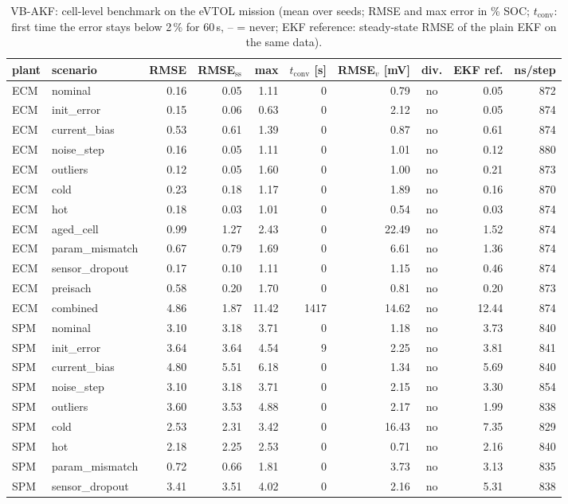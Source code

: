 \begin{table}[H]\centering\footnotesize\setlength{\tabcolsep}{4pt}
\caption{VB-AKF: cell-level benchmark on the eVTOL mission (mean over seeds; RMSE and max error in \% SOC; $t_\mathrm{conv}$: first time the error stays below 2\,\% for 60\,s, -- = never; EKF reference: steady-state RMSE of the plain EKF on the same data).}\label{tab:cell_VBAKF}
\begin{tabular}{llrrrrrcrr}\toprule
plant & scenario & RMSE & RMSE$_\mathrm{ss}$ & max & $t_\mathrm{conv}$ [s] & RMSE$_v$ [mV] & div. & EKF ref. & ns/step \\ \midrule
ECM & nominal & 0.16 & 0.05 & 1.11 & 0 & 0.79 & no & 0.05 & 872 \\
ECM & init\_error & 0.15 & 0.06 & 0.63 & 0 & 2.12 & no & 0.05 & 874 \\
ECM & current\_bias & 0.53 & 0.61 & 1.39 & 0 & 0.87 & no & 0.61 & 874 \\
ECM & noise\_step & 0.16 & 0.05 & 1.11 & 0 & 1.01 & no & 0.12 & 880 \\
ECM & outliers & 0.12 & 0.05 & 1.60 & 0 & 1.00 & no & 0.21 & 873 \\
ECM & cold & 0.23 & 0.18 & 1.17 & 0 & 1.89 & no & 0.16 & 870 \\
ECM & hot & 0.18 & 0.03 & 1.01 & 0 & 0.54 & no & 0.03 & 874 \\
ECM & aged\_cell & 0.99 & 1.27 & 2.43 & 0 & 22.49 & no & 1.52 & 874 \\
ECM & param\_mismatch & 0.67 & 0.79 & 1.69 & 0 & 6.61 & no & 1.36 & 874 \\
ECM & sensor\_dropout & 0.17 & 0.10 & 1.11 & 0 & 1.15 & no & 0.46 & 874 \\
ECM & preisach & 0.58 & 0.20 & 1.70 & 0 & 0.81 & no & 0.20 & 873 \\
ECM & combined & 4.86 & 1.87 & 11.42 & 1417 & 14.62 & no & 12.44 & 874 \\
\midrule
SPM & nominal & 3.10 & 3.18 & 3.71 & 0 & 1.18 & no & 3.73 & 840 \\
SPM & init\_error & 3.64 & 3.64 & 4.54 & 9 & 2.25 & no & 3.81 & 841 \\
SPM & current\_bias & 4.80 & 5.51 & 6.18 & 0 & 1.34 & no & 5.69 & 840 \\
SPM & noise\_step & 3.10 & 3.18 & 3.71 & 0 & 2.15 & no & 3.30 & 854 \\
SPM & outliers & 3.60 & 3.53 & 4.88 & 0 & 2.17 & no & 1.99 & 838 \\
SPM & cold & 2.53 & 2.31 & 3.42 & 0 & 16.43 & no & 7.35 & 829 \\
SPM & hot & 2.18 & 2.25 & 2.53 & 0 & 0.71 & no & 2.16 & 840 \\
SPM & param\_mismatch & 0.72 & 0.66 & 1.81 & 0 & 3.73 & no & 3.13 & 835 \\
SPM & sensor\_dropout & 3.41 & 3.51 & 4.02 & 0 & 2.16 & no & 5.31 & 838 \\
\bottomrule\end{tabular}\end{table}
